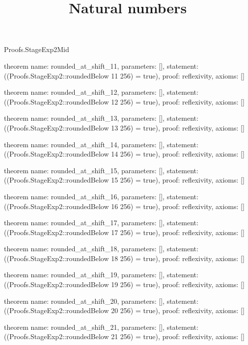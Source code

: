 \begin{lexlean}{Proofs.StageExp2Mid}
\title{Natural numbers}
\begin{semanticmodule}
theorem{
  name: rounded_at_shift_11,
  parameters: [],
  statement: ((Proofs.StageExp2::roundedBelow 11 256) = true),
  proof: reflexivity{},
  axioms: []
}

theorem{
  name: rounded_at_shift_12,
  parameters: [],
  statement: ((Proofs.StageExp2::roundedBelow 12 256) = true),
  proof: reflexivity{},
  axioms: []
}

theorem{
  name: rounded_at_shift_13,
  parameters: [],
  statement: ((Proofs.StageExp2::roundedBelow 13 256) = true),
  proof: reflexivity{},
  axioms: []
}

theorem{
  name: rounded_at_shift_14,
  parameters: [],
  statement: ((Proofs.StageExp2::roundedBelow 14 256) = true),
  proof: reflexivity{},
  axioms: []
}

theorem{
  name: rounded_at_shift_15,
  parameters: [],
  statement: ((Proofs.StageExp2::roundedBelow 15 256) = true),
  proof: reflexivity{},
  axioms: []
}

theorem{
  name: rounded_at_shift_16,
  parameters: [],
  statement: ((Proofs.StageExp2::roundedBelow 16 256) = true),
  proof: reflexivity{},
  axioms: []
}

theorem{
  name: rounded_at_shift_17,
  parameters: [],
  statement: ((Proofs.StageExp2::roundedBelow 17 256) = true),
  proof: reflexivity{},
  axioms: []
}

theorem{
  name: rounded_at_shift_18,
  parameters: [],
  statement: ((Proofs.StageExp2::roundedBelow 18 256) = true),
  proof: reflexivity{},
  axioms: []
}

theorem{
  name: rounded_at_shift_19,
  parameters: [],
  statement: ((Proofs.StageExp2::roundedBelow 19 256) = true),
  proof: reflexivity{},
  axioms: []
}

theorem{
  name: rounded_at_shift_20,
  parameters: [],
  statement: ((Proofs.StageExp2::roundedBelow 20 256) = true),
  proof: reflexivity{},
  axioms: []
}

theorem{
  name: rounded_at_shift_21,
  parameters: [],
  statement: ((Proofs.StageExp2::roundedBelow 21 256) = true),
  proof: reflexivity{},
  axioms: []
}
\end{semanticmodule}
\end{lexlean}
